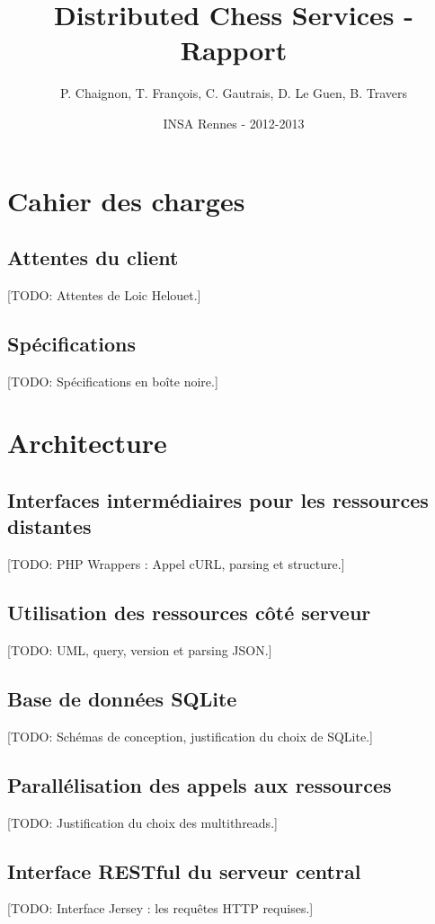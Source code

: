 \documentclass[a4paper,11pt]{report}
\title{Distributed Chess Services - Rapport}
\author{P. Chaignon, T. François, C. Gautrais, D. Le Guen, B. Travers}
\date{INSA Rennes - 2012-2013}
\begin{document}
\maketitle{}

\chapter{Cahier des charges}

\section{Attentes du client}
[TODO: Attentes de Loic Helouet.]

\section{Spécifications}
[TODO: Spécifications en boîte noire.]


\chapter{Architecture}

\section{Interfaces intermédiaires pour les ressources distantes}
[TODO: PHP Wrappers : Appel cURL, parsing et structure.]

\section{Utilisation des ressources côté serveur}
[TODO: UML, query, version et parsing JSON.]

\section{Base de données SQLite}
[TODO: Schémas de conception, justification du choix de SQLite.]

\section{Parallélisation des appels aux ressources}
[TODO: Justification du choix des multithreads.]

\section{Interface RESTful du serveur central}
[TODO: Interface Jersey : les requêtes HTTP requises.]
\end{document}
